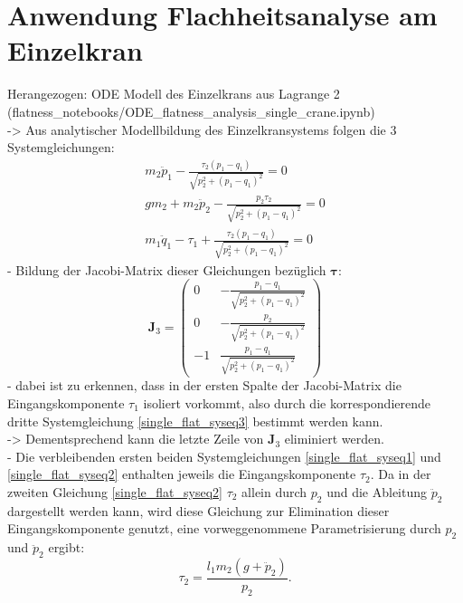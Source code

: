 \section{Anwendung Flachheitsanalyse am Einzelkran}
Herangezogen: ODE Modell des Einzelkrans aus Lagrange 2 \\ (flatness\_notebooks/ODE\_flatness\_analysis\_single\_crane.ipynb) \\
-> Aus analytischer Modellbildung des Einzelkransystems folgen die 3 Systemgleichungen:
\begin{align}
	m_{2} \ddot{p}_{1} - \frac{\tau_{2} \left(p_{1} - q_{1}\right)}{\sqrt{p_{2}^{2} + \left(p_{1} - q_{1}\right)^{2}}} = 0\label{single_flat_syseq1}\\
	g m_{2} + m_{2} \ddot{p}_{2} - \frac{p_{2} \tau_{2}}{\sqrt{p_{2}^{2} + \left(p_{1} - q_{1}\right)^{2}}} = 0\label{single_flat_syseq2}\\
	m_{1} \ddot{q}_{1} - \tau_{1} + \frac{\tau_{2} \left(p_{1} - q_{1}\right)}{\sqrt{p_{2}^{2} + \left(p_{1} - q_{1}\right)^{2}}} = 0\label{single_flat_syseq3}
\end{align}
- Bildung der Jacobi-Matrix dieser Gleichungen bezüglich $\mathbf{\tau}$:
\begin{equation}
	\mathbf{J}_3 =
	\left(\begin{matrix}
		0 & - \frac{p_{1} - q_{1}}{\sqrt{p_{2}^{2} + \left(p_{1} - q_{1}\right)^{2}}}\\
		0 & - \frac{p_{2}}{\sqrt{p_{2}^{2} + \left(p_{1} - q_{1}\right)^{2}}}\\
		-1 & \frac{p_{1} - q_{1}}{\sqrt{p_{2}^{2} + \left(p_{1} - q_{1}\right)^{2}}}
	\end{matrix}\right)
\end{equation}
- dabei ist zu erkennen, dass in der ersten Spalte der Jacobi-Matrix die Eingangskomponente $\tau_{1}$ isoliert vorkommt, also durch die korrespondierende dritte Systemgleichung \ref{single_flat_syseq3} bestimmt werden kann. \\
-> Dementsprechend kann die letzte Zeile von $\mathbf{J}_3$ eliminiert werden. \\
- Die verbleibenden ersten beiden Systemgleichungen \ref{single_flat_syseq1} und \ref{single_flat_syseq2} enthalten jeweils die Eingangskomponente $\tau_2$. Da in der zweiten Gleichung \ref{single_flat_syseq2} $\tau_2$ allein durch $p_2$ und die Ableitung $\ddot{p}_2$ dargestellt werden kann, wird diese Gleichung zur Elimination dieser Eingangskomponente genutzt, eine vorweggenommene Parametrisierung durch $p_2$ und $\ddot{p}_2$ ergibt:
\begin{equation}
	\label{eq:pre_single_crane_tau2_w_q1}
	\tau_2 = \frac{l_{1} m_{2} \left(g + \ddot{p}_{2}\right)}{p_{2}}.
\end{equation}

